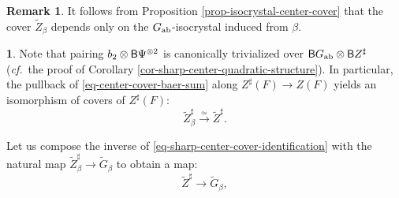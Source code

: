 \documentclass[10pt,english,reqno]{amsart}
\newcommand{\deloop}{\textnormal{\textsf{B}}}
\newcommand{\abelian}{\textnormal{ab}}
\theoremstyle{definition}
\newtheorem{rem}[subsubsection]{Remark}
\numberwithin{equation}{section}
\newtheorem{untitledsubsubsection}[subsubsection]{}
\newenvironment{void}
{\begin{untitledsubsubsection}}
{\end{untitledsubsubsection}}
\begin{document}

\begin{rem}
It follows from Proposition \ref{prop-isocrystal-center-cover} that the cover $\widetilde Z_{\beta}$ depends only on the $G_{\abelian}$-isocrystal induced from $\beta$.
\end{rem}


\begin{void}
Note that pairing $b_2 \otimes \deloop\Psi^{\otimes 2}$ is canonically trivialized over $\deloop G_{\abelian} \otimes \deloop Z^{\sharp}$ (\emph{cf.}~the proof of Corollary \ref{cor-sharp-center-quadratic-structure}). In particular, the pullback of \eqref{eq-center-cover-baer-sum} along $Z^{\sharp}(F) \rightarrow Z(F)$ yields an isomorphism of covers of $Z^{\sharp}(F)$:
\begin{equation}
\label{eq-sharp-center-cover-identification}
	\widetilde Z_{\beta}^{\sharp} \xrightarrow{\simeq} \widetilde Z^{\sharp}.
\end{equation}

Let us compose the inverse of \eqref{eq-sharp-center-cover-identification} with the natural map $\widetilde Z_{\beta}^{\sharp} \rightarrow \widetilde G_{\beta}$ to obtain a map:
\begin{equation}
\label{eq-sharp-center-map-to-isocrystal}
\widetilde Z^{\sharp} \rightarrow \widetilde G_{\beta},
\end{equation}
\end{void}

\end{document}
